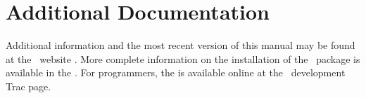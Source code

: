 \section{Additional Documentation} \label{additional-docs}
Additional information and the most recent version of this manual may
be found at the \PSI\ website .  
More complete information on the installation of the \PSIfour\ package
is available in the .
For programmers, the  is available online
at the \PSI\ development Trac page.
